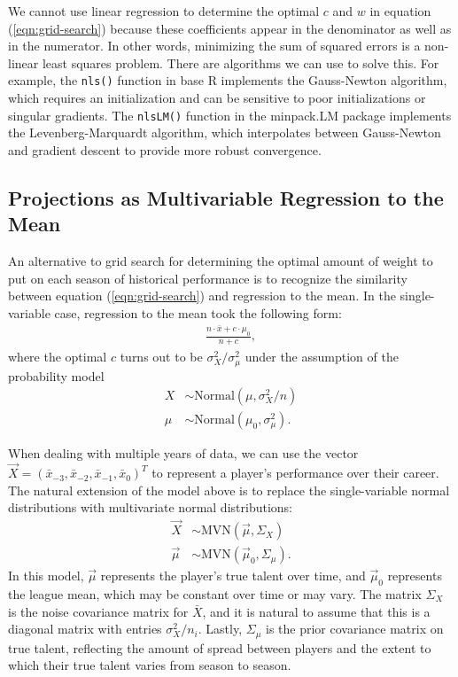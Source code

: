 \documentclass{article}
\begin{document}
      We cannot use linear regression to determine the optimal $c$ and $w$ in equation (\ref{eqn:grid-search}) because these coefficients appear in the denominator as well as in the numerator. In other words, minimizing the sum of squared errors is a non-linear least squares problem. There are algorithms we can use to solve this. For example, the \texttt{nls()} function in base R implements the Gauss-Newton algorithm, which requires an initialization and can be sensitive to poor initializations or singular gradients. The \texttt{nlsLM()} function in the minpack.LM package implements the Levenberg-Marquardt algorithm, which interpolates between Gauss-Newton and gradient descent to provide more robust convergence.
  
    \subsection{\sc Projections as Multivariable Regression to the Mean}
  
      An alternative to grid search for determining the optimal amount of weight to put on each season of historical performance is to recognize the similarity between equation (\ref{eqn:grid-search}) and regression to the mean. In the single-variable case, regression to the mean took the following form:
      \begin{align*}
        \frac{n \cdot \bar x + c \cdot \mu_0}{n + c},
      \end{align*}
      where the optimal $c$ turns out to be $\sigma^2_X / \sigma^2_\mu$ under the assumption of the probability model
      \begin{align*}
        X &\sim \mbox{Normal}(\mu, \sigma^2_X / n)\\
        \mu &\sim \mbox{Normal}(\mu_0, \sigma^2_\mu).
      \end{align*}
  
      When dealing with multiple years of data, we can use the vector $\vec X = (\bar x_{-3}, \bar x_{-2}, \bar x_{-1}, \bar x_0)^T$ to represent a player's performance over their career. The natural extension of the model above is to replace the single-variable normal distributions with multivariate normal distributions:
      \begin{align*}
        \vec X &\sim \mbox{MVN}(\vec\mu, \Sigma_X)\\
        \vec\mu &\sim \mbox{MVN}(\vec\mu_0, \Sigma_\mu).
      \end{align*}
      In this model, $\vec \mu$ represents the player's true talent over time, and $\vec \mu_0$ represents the league mean, which may be constant over time or may vary. The matrix $\Sigma_X$ is the noise covariance matrix for $\bar X$, and it is natural to assume that this is a diagonal matrix with entries $\sigma^2_X / n_i$. Lastly, $\Sigma_\mu$ is the prior covariance matrix on true talent, reflecting the amount of spread between players and the extent to which their true talent varies from season to season.
  
\end{document}
